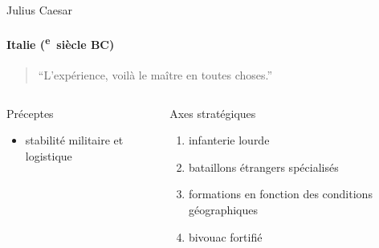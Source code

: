 \documentclass[utf8,hyperref={pagebackref}]{beamer}
\newcommand{\cRM}[1]{\MakeUppercase{\romannumeral #1}}  %
\newcommand{\siecle}[1]{\cRM{#1}\textsuperscript{e}~siècle}
\begin{document}
\begin{frame}{Julius Caesar}
\framesubtitle{Italie (\siecle{1} BC)}
\begin{quote}“L’expérience, voilà le maître en toutes choses.”\end{quote}
\vfill
\begin{columns}[t]
\begin{column}{0.5\linewidth}
Préceptes
\begin{itemize}
\item stabilité militaire et logistique
\end{itemize}
\end{column}
\begin{column}{0.5\linewidth}
Axes stratégiques
\begin{enumerate}
\item infanterie lourde
\item bataillons étrangers spécialisés
\item formations en fonction des conditions géographiques
\item bivouac fortifié
\end{enumerate}
\end{column}
\end{columns}
\end{frame}
\end{document}
